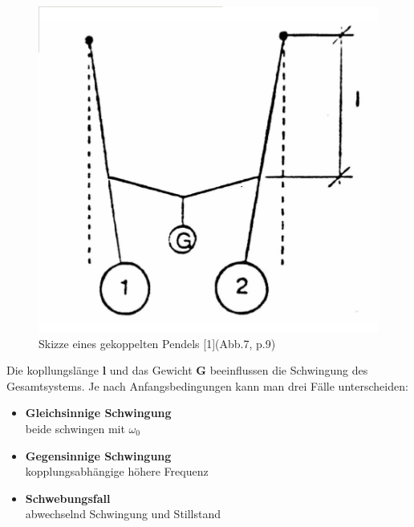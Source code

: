 \documentclass[12pt,a4paper]{article}
\begin{document}
\begin{multicols}{2}
\begin{figure}[H]
	\centering
	\includegraphics[scale=0.4]{./figure/skizze_kopplung.png}
	\caption{Skizze eines gekoppelten Pendels [1](Abb.7, p.9)}
	\label{fig:gekoppelt_skizze}
\end{figure}
Die kopllungslänge \textbf{l} und das Gewicht \textbf{G} beeinflussen die Schwingung des Gesamtsystems. Je nach Anfangsbedingungen kann man drei Fälle unterscheiden:\\
\begin{itemize}
	\item  \textbf{Gleichsinnige Schwingung} \\ beide schwingen mit $\omega_0$
	\item  \textbf{Gegensinnige Schwingung} \\ kopplungsabhängige höhere Frequenz
	\item  \textbf{Schwebungsfall} \\ abwechselnd Schwingung und Stillstand
\end{itemize}



\end{multicols}
\end{document}
